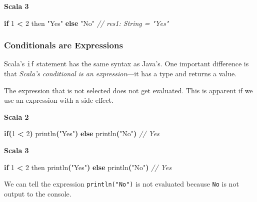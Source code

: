 \documentclass[11pt,a5paper,]{book}
\newenvironment{Shaded}{\begin{snugshade}}{\end{snugshade}}
\newcommand{\CommentTok}[1]{\textcolor[rgb]{0.56,0.35,0.01}{\textit{#1}}}
\newcommand{\ControlFlowTok}[1]{\textcolor[rgb]{0.13,0.29,0.53}{\textbf{#1}}}
\newcommand{\DecValTok}[1]{\textcolor[rgb]{0.00,0.00,0.81}{#1}}
\newcommand{\FunctionTok}[1]{\textcolor[rgb]{0.00,0.00,0.00}{#1}}
\newcommand{\NormalTok}[1]{#1}
\newcommand{\OperatorTok}[1]{\textcolor[rgb]{0.81,0.36,0.00}{\textbf{#1}}}
\newcommand{\StringTok}[1]{\textcolor[rgb]{0.31,0.60,0.02}{#1}}
\begin{document}
\textbf{Scala 3}

\begin{Shaded}
\begin{Highlighting}[]
\ControlFlowTok{if} \DecValTok{1} \OperatorTok{\textless{}} \DecValTok{2}\NormalTok{ then }\StringTok{"Yes"} \ControlFlowTok{else} \StringTok{"No"}
\CommentTok{// res1: String = "Yes"}
\end{Highlighting}
\end{Shaded}

\hypertarget{conditionals-are-expressions}{%
\subsubsection*{Conditionals are
Expressions}\label{conditionals-are-expressions}}

Scala's \texttt{if} statement has the same syntax as Java's. One
important difference is that \emph{Scala's conditional is an
expression}---it has a type and returns a value.

The expression that is not selected does not get evaluated. This is
apparent if we use an expression with a side-effect.

\textbf{Scala 2}

\begin{Shaded}
\begin{Highlighting}[]
\ControlFlowTok{if}\OperatorTok{(}\DecValTok{1} \OperatorTok{\textless{}} \DecValTok{2}\OperatorTok{)} \FunctionTok{println}\OperatorTok{(}\StringTok{"Yes"}\OperatorTok{)} \ControlFlowTok{else} \FunctionTok{println}\OperatorTok{(}\StringTok{"No"}\OperatorTok{)}
\CommentTok{// Yes}
\end{Highlighting}
\end{Shaded}

\textbf{Scala 3}

\begin{Shaded}
\begin{Highlighting}[]
\ControlFlowTok{if} \DecValTok{1} \OperatorTok{\textless{}} \DecValTok{2}\NormalTok{ then }\FunctionTok{println}\OperatorTok{(}\StringTok{"Yes"}\OperatorTok{)} \ControlFlowTok{else} \FunctionTok{println}\OperatorTok{(}\StringTok{"No"}\OperatorTok{)}
\CommentTok{// Yes}
\end{Highlighting}
\end{Shaded}

We can tell the expression \texttt{println("No")} is not evaluated
because \texttt{No} is not output to the console.
\end{document}
